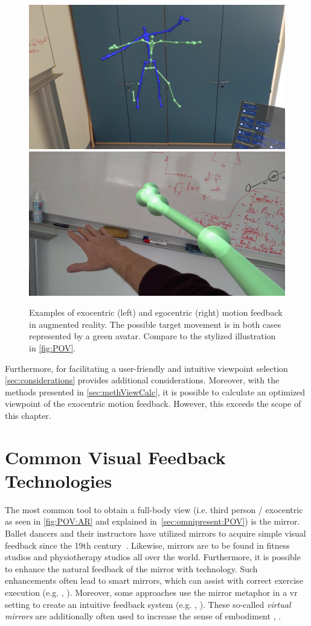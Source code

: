 \begin{figure}[b!]
	\centering
	\includegraphics[width=0.49\linewidth]{pictures/ExocentricAR.jpg}\hfill
	\includegraphics[width=0.49\linewidth]{pictures/EgocentricAR.jpg}
	\caption[Examples of exocentric and egocentric motion feedback in \acrshort{ar}.]{Examples of exocentric (left) and egocentric (right) motion feedback in augmented reality. The possible target movement is in both cases represented by a green avatar. Compare to the stylized illustration in \autoref{fig:POV}.}
	\label{fig:POV:AR}
\end{figure}

Furthermore, for facilitating a user-friendly and intuitive viewpoint selection \autoref{sec:considerations} provides additional considerations. Moreover, with the methods presented in \autoref{sec:methViewCalc}, it is possible to calculate an optimized viewpoint of the exocentric motion feedback. However, this exceeds the scope of this chapter.

\section{Common Visual Feedback Technologies} %
The most common tool to obtain a full-body view (i.e. third person / exocentric as seen in \autoref{fig:POV:AR} and explained in~\autoref{sec:omnipresent:POV}) is the mirror. Ballet dancers and their instructors have utilized mirrors to acquire simple visual feedback since the 19th century~\cite{desmond1997mim}. Likewise, mirrors are to be found in fitness studios and physiotherapy studios all over the world. Furthermore, it is possible to enhance the natural feedback of the mirror with technology. Such enhancements often lead to smart mirrors, which can assist with correct exercise execution (e.g. \cite{kim2020rtm}, \cite{park2021ued}). Moreover, some approaches use the mirror metaphor in a \acrshort{vr} setting to create an intuitive feedback system (e.g. \cite{waltemate2016tlp}, \cite{huelsmann2019ssp}). These so-called \emph{virtual mirrors} are additionally often used to increase the sense of embodiment \cite{inoue2021virtual}, \cite{gonzalesfranco2010contribution}.

